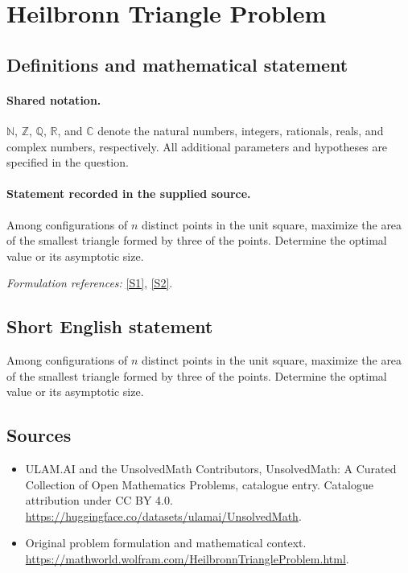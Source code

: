 \documentclass[11pt]{article}
\newcommand{\sref}[2]{\hyperlink{source:#1:#2}{[S#2]}}
\begin{document}
\section{Heilbronn Triangle Problem}\label{statement}

\subsection{Definitions and mathematical statement}

\paragraph{Shared notation.}$\mathbb N$, $\mathbb Z$, $\mathbb Q$, $\mathbb R$, and $\mathbb C$ denote the natural numbers, integers, rationals, reals, and complex numbers, respectively. All additional parameters and hypotheses are specified in the question.


\paragraph{Statement recorded in the supplied source.}
Among configurations of $n$ distinct points in the unit square, maximize the area of the smallest triangle formed by three of the points. Determine the optimal value or its asymptotic size.
\par\smallskip\textit{Formulation references:} \sref{statement}{1}, \sref{statement}{2}.
\subsection{Short English statement}
Among configurations of $n$ distinct points in the unit square, maximize the area of the smallest triangle formed by three of the points. Determine the optimal value or its asymptotic size.
\subsection{Sources}
\begin{itemize}
\item[\hypertarget{source:statement:1}{S1}] ULAM.AI and the UnsolvedMath Contributors, UnsolvedMath: A Curated Collection of Open Mathematics Problems, catalogue entry. Catalogue attribution under CC BY 4.0.
\url{https://huggingface.co/datasets/ulamai/UnsolvedMath}.
\item[\hypertarget{source:statement:2}{S2}] Original problem formulation and mathematical context.
\url{https://mathworld.wolfram.com/HeilbronnTriangleProblem.html}.
\end{itemize}
\label{end:statement}
\end{document}
